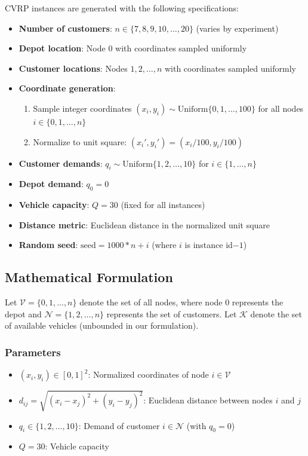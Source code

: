 \documentclass[a4paper,twoside]{article}
\begin{document}
CVRP instances are generated with the following specifications:

\begin{itemize}
    \item \textbf{Number of customers}: $n \in \{7, 8, 9, 10, \ldots, 20\}$ (varies by experiment)
    \item \textbf{Depot location}: Node $0$ with coordinates sampled uniformly
    \item \textbf{Customer locations}: Nodes $1, 2, \ldots, n$ with coordinates sampled uniformly
    \item \textbf{Coordinate generation}: 
        \begin{enumerate}
            \item Sample integer coordinates $(x_i, y_i) \sim \text{Uniform}\{0, 1, \ldots, 100\}$ for all nodes $i \in \{0, 1, \ldots, n\}$
            \item Normalize to unit square: $(x_i', y_i') = (x_i/100, y_i/100)$
        \end{enumerate}
    \item \textbf{Customer demands}: $q_i \sim \text{Uniform}\{1, 2, \ldots, 10\}$ for $i \in \{1, \ldots, n\}$
    \item \textbf{Depot demand}: $q_0 = 0$
    \item \textbf{Vehicle capacity}: $Q = 30$ (fixed for all instances)
    \item \textbf{Distance metric}: Euclidean distance in the normalized unit square
	\item \textbf{Random seed}: $\text{seed} = 1000 * n + i$ (where $i$ is instance id$- 1$)
\end{itemize}

\subsection{Mathematical Formulation}

Let $\mathcal{V} = \{0, 1, \ldots, n\}$ denote the set of all nodes, where node $0$ represents the depot and $\mathcal{N} = \{1, 2, \ldots, n\}$ represents the set of customers. Let $\mathcal{K}$ denote the set of available vehicles (unbounded in our formulation).

\subsubsection{Parameters}
\begin{itemize}
    \item $(x_i, y_i) \in [0, 1]^2$: Normalized coordinates of node $i \in \mathcal{V}$
    \item $d_{ij} = \sqrt{(x_i - x_j)^2 + (y_i - y_j)^2}$: Euclidean distance between nodes $i$ and $j$
    \item $q_i \in \{1, 2, \ldots, 10\}$: Demand of customer $i \in \mathcal{N}$ (with $q_0 = 0$)
    \item $Q = 30$: Vehicle capacity
\end{itemize}
\end{document}
